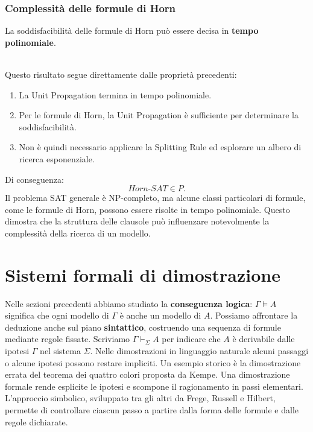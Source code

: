 \subsubsection*{Complessità delle formule di Horn}
\colorbox{SALZO}{\parbox{\dimexpr\linewidth-2\fboxsep}{
\begin{theorem}
La soddisfacibilità delle formule di Horn
può essere decisa in \textbf{tempo polinomiale}.
\end{theorem}
}}\smallskip\\
Questo risultato segue direttamente
dalle proprietà precedenti:
\begin{enumerate}
    \item La Unit Propagation termina
    in tempo polinomiale.

    \item Per le formule di Horn, la Unit
    Propagation è sufficiente per
    determinare la soddisfacibilità.

    \item Non è quindi necessario applicare
    la Splitting Rule ed esplorare
    un albero di ricerca esponenziale.
\end{enumerate}
Di conseguenza:
\[
\boxed{Horn\text{-}SAT\in P.}
\]
Il problema SAT generale è NP-completo,
ma alcune classi particolari di formule,
come le formule di Horn, possono essere
risolte in tempo polinomiale.
Questo dimostra che la struttura delle
clausole può influenzare notevolmente
la complessità della ricerca di un modello.






\section{Sistemi formali di dimostrazione}
Nelle sezioni precedenti abbiamo studiato la \textbf{conseguenza logica}:
$\Gamma \models A$ significa che ogni modello di $\Gamma$ è anche un
modello di $A$. Possiamo affrontare la deduzione anche sul piano
\textbf{sintattico}, costruendo una sequenza di formule mediante regole
fissate. Scriviamo $\Gamma \vdash_\Sigma A$ per indicare che $A$ è
derivabile dalle ipotesi $\Gamma$ nel sistema $\Sigma$.
Nelle dimostrazioni in linguaggio naturale alcuni passaggi o alcune
ipotesi possono restare impliciti. Un esempio storico è la dimostrazione
errata del teorema dei quattro colori proposta da Kempe. Una dimostrazione
formale rende esplicite le ipotesi e scompone il ragionamento in passi
elementari. L'approccio simbolico, sviluppato tra gli altri da Frege,
Russell e Hilbert, permette di controllare ciascun passo a partire dalla
forma delle formule e dalle regole dichiarate.

